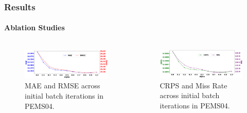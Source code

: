 \documentclass[light]{lutbeamer} %
\begin{document}
\begin{frame}
    \frametitle{Results}
    \framesubtitle{Ablation Studies}
    \begin{columns}
        \begin{column}{0.5\textwidth}
            \begin{figure}
                \centering
                \includegraphics[width=\textwidth]{figures/pems07_mae_rmse_alpha.png}
                \caption{MAE and RMSE across initial batch iterations in PEMS04.}
            \end{figure}
        \end{column}
        \begin{column}{0.5\textwidth}
            \begin{figure}
                \centering
                \includegraphics[width=\textwidth]{figures/pems07_crps_mis_alpha.png}
                \caption{CRPS and Miss Rate across initial batch iterations in PEMS04.}
            \end{figure}
        \end{column}
    \end{columns}

\end{frame}


\end{document}

